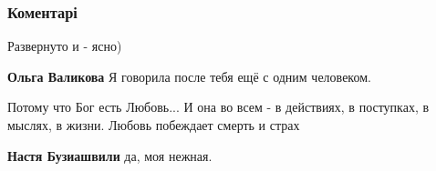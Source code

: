  
 
 
 
 
\subsubsection{Коментарі}
\label{sec:19_08_2021.fb.bilchenko_evgenia.1.svoboda_lichnosty_hristos.cmt}

\begin{itemize}

 
Развернуто и - ясно)

\begin{itemize}
 
\textbf{Ольга Валикова} Я говорила после тебя ещё с одним человеком.
\end{itemize}

 
Потому что Бог есть Любовь... И она во всем - в действиях, в поступках, в
мыслях, в жизни. Любовь побеждает смерть и страх

\begin{itemize}
 
\textbf{Настя Бузиашвили} да, моя нежная.
\end{itemize}


\end{itemize}
